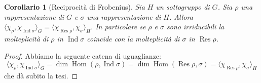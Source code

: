 \documentclass[11pt]{article}
\theoremstyle{plain}
\newtheorem*{cor}{Corollario}
\theoremstyle{definition}
\theoremstyle{remark}
\DeclareMathOperator{\Hom}{Hom}
\DeclareMathOperator{\Ind}{Ind}
\DeclareMathOperator{\Res}{Res}
\begin{document}
\begin{cor}[Reciprocità di Frobenius]
Sia $H$ un sottogruppo di $G$. Sia $\rho$ una rappresentazione di $G$ e $\sigma$ una rappresentazione di $H$.
Allora $\langle \chi_\rho, \chi_{\Ind\sigma}\rangle_G = \langle \chi_{\Res \rho}, \chi_\sigma\rangle_H$.
In particolare se $\rho$ e $\sigma$ sono irriducibili la molteplicità di $\rho$ in $\Ind\sigma$ coincide con la molteplicità di $\sigma$ in $\Res\rho$.
\end{cor}
\begin{proof}
Abbiamo la seguente catena di uguaglianze:
\[ \langle \chi_\rho, \chi_{\Ind\sigma}\rangle_G = \dim\Hom(\rho, \Ind\sigma) = \dim\Hom(\Res\rho, \sigma) = \langle \chi_{\Res \rho}, \chi_\sigma\rangle_H\]
che dà subito la tesi.
\end{proof}
\end{document}
